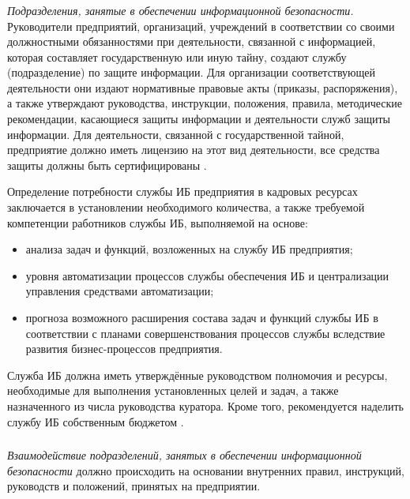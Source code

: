 \subsubsection{}
\label{subsubsec:measures:organisational:units}

\textit{Подразделения, занятые в обеспечении информационной безопасности.} Руководители предприятий, организаций, учреждений в соответствии со своими должностными обязанностями при деятельности, связанной с информацией, которая составляет государственную или иную тайну, создают службу (подразделение) по защите информации.
Для организации соответствующей деятельности они издают нормативные правовые акты (приказы, распоряжения), а также утверждают руководства, инструкции, положения, правила, методические рекомендации, касающиеся защиты информации и деятельности служб защиты информации.
Для деятельности, связанной с государственной тайной, предприятие должно иметь лицензию на этот вид деятельности, все средства защиты должны быть сертифицированы \cite{vostrezova_ural}.

Определение потребности службы ИБ предприятия в кадровых ресурсах заключается в установлении необходимого количества, а также требуемой компетенции работников службы ИБ, выполняемой на основе:
\begin{itemize}
	\item анализа задач и функций, возложенных на службу ИБ предприятия;
	\item уровня автоматизации процессов службы обеспечения ИБ и централизации управления средствами автоматизации;
	\item прогноза возможного расширения состава задач и функций службы ИБ в соответствии с планами совершенствования процессов службы вследствие развития бизнес-процессов предприятия.
\end{itemize}

Служба ИБ должна иметь утверждённые руководством полномочия и ресурсы, необходимые для выполнения установленных целей и задач, а также назначенного из числа руководства куратора. Кроме того, рекомендуется наделить службу ИБ собственным бюджетом \cite{nbrb}.

\subsubsection{}
\label{subsubsec:measures:organisational:intercommunication}

\textit{Взаимодействие подразделений, занятых в обеспечении информационной безопасности} должно происходить на основании внутренних правил, инструкций, руководств и положений, принятых на предприятии.

